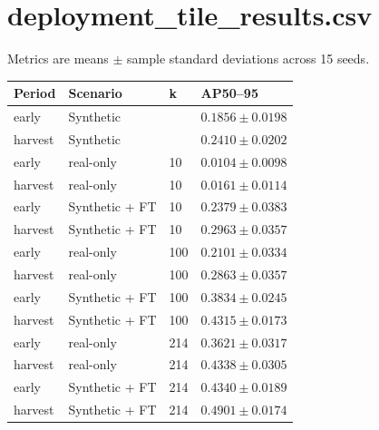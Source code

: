 \documentclass{article}
\begin{document}
\section*{deployment\_tile\_results.csv}
Metrics are means $\pm$ sample standard deviations across 15 seeds.\par\medskip
\begin{lrbox}{\resulttable}\begin{tabular}{llll}
\toprule
Period & Scenario & k & AP50--95 \\
\midrule
early & Synthetic &  & $0.1856 \pm 0.0198$ \\
harvest & Synthetic &  & $0.2410 \pm 0.0202$ \\
early & real-only & 10 & $0.0104 \pm 0.0098$ \\
harvest & real-only & 10 & $0.0161 \pm 0.0114$ \\
early & Synthetic + FT & 10 & $0.2379 \pm 0.0383$ \\
harvest & Synthetic + FT & 10 & $0.2963 \pm 0.0357$ \\
early & real-only & 100 & $0.2101 \pm 0.0334$ \\
harvest & real-only & 100 & $0.2863 \pm 0.0357$ \\
early & Synthetic + FT & 100 & $0.3834 \pm 0.0245$ \\
harvest & Synthetic + FT & 100 & $0.4315 \pm 0.0173$ \\
early & real-only & 214 & $0.3621 \pm 0.0317$ \\
harvest & real-only & 214 & $0.4338 \pm 0.0305$ \\
early & Synthetic + FT & 214 & $0.4340 \pm 0.0189$ \\
harvest & Synthetic + FT & 214 & $0.4901 \pm 0.0174$ \\
\bottomrule
\end{tabular}\end{lrbox}
\noindent\ifdim\wd\resulttable>\linewidth\resizebox{.99\linewidth}{!}{\usebox{\resulttable}}\else\usebox{\resulttable}\fi
\clearpage
\end{document}
